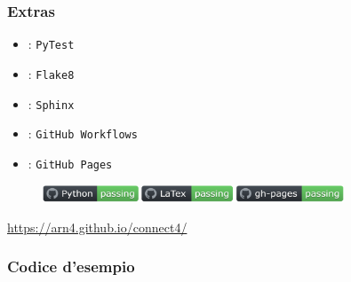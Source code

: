 \documentclass[handout]{beamer}
\begin{document}
  \begin{frame}
    \frametitle{Extras}
    \begin{itemize}
      \item {}: \texttt{PyTest}
      \item {}: \texttt{Flake8}
      \item {}: \texttt{Sphinx}
      \item {}: \texttt{GitHub Workflows}
      \item {}: \texttt{GitHub Pages}  
    \end{itemize}
    \begin{figure}
      \includegraphics[width=0.8\textwidth]{img/github_badges.png}
    \end{figure}
    \begin{center}
      \url{https://arn4.github.io/connect4/}
    \end{center}
  \end{frame}


  \begin{frame}
    \frametitle{Codice d'esempio}
    \inputminted[fontsize=\scriptsize]{python3}{code/example-game.py}
  \end{frame}
\end{document}
